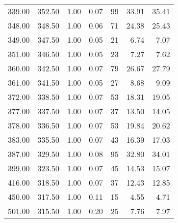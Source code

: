 \begin{table}
\begin{tabular}{rrrrrrr}
339.00 & 352.50 & 1.00 & 0.07 & 99 & 33.91 & 35.41 \\
348.00 & 348.50 & 1.00 & 0.06 & 71 & 24.38 & 25.43 \\
349.00 & 347.50 & 1.00 & 0.05 & 21 & 6.74 & 7.07 \\
351.00 & 346.50 & 1.00 & 0.05 & 23 & 7.27 & 7.62 \\
360.00 & 342.50 & 1.00 & 0.07 & 79 & 26.67 & 27.79 \\
361.00 & 341.50 & 1.00 & 0.05 & 27 & 8.68 & 9.09 \\
372.00 & 338.50 & 1.00 & 0.07 & 53 & 18.31 & 19.05 \\
377.00 & 337.50 & 1.00 & 0.07 & 37 & 13.50 & 14.05 \\
378.00 & 336.50 & 1.00 & 0.07 & 53 & 19.84 & 20.62 \\
383.00 & 335.50 & 1.00 & 0.07 & 43 & 16.39 & 17.03 \\
387.00 & 329.50 & 1.00 & 0.08 & 95 & 32.80 & 34.01 \\
399.00 & 323.50 & 1.00 & 0.07 & 45 & 14.53 & 15.07 \\
416.00 & 318.50 & 1.00 & 0.07 & 37 & 12.43 & 12.85 \\
450.00 & 317.50 & 1.00 & 0.11 & 15 & 4.55 & 4.71 \\
501.00 & 315.50 & 1.00 & 0.20 & 25 & 7.76 & 7.97 \\
\bottomrule
\end{tabular}
\end{table}
